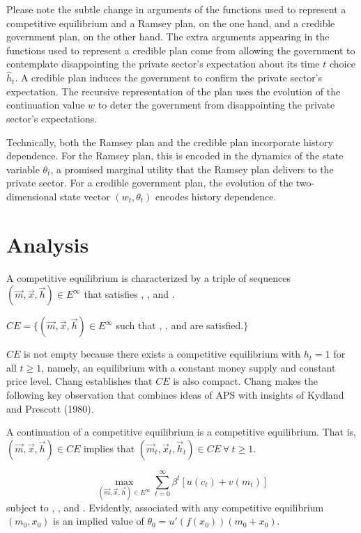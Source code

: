 Please note the subtle change in arguments of the functions used to represent  a competitive equilibrium and a  Ramsey plan, on the one hand,
and a credible government plan, on the other hand. The extra arguments appearing in the functions used to represent a credible plan
come from allowing the government to contemplate disappointing the private sector's expectation about its time $t$ choice $\hat h_t$. A credible plan induces
 the government to confirm the private sector's expectation.  The recursive representation of the plan uses
the evolution of the  continuation value $w$  to deter the government from disappointing the private sector's expectations.


Technically, both the Ramsey plan and the credible plan incorporate history dependence.  For the Ramsey plan, this is encoded in
the dynamics of the state variable $\theta_t$, a promised marginal utility that the Ramsey plan delivers to the private sector.
For a credible government plan, the evolution of the two-dimensional state vector $(w_t, \theta_t)$  encodes  history dependence.


\section{Analysis}

A competitive equilibrium  is characterized by a triple of sequences $(\vec m, \vec x, \vec h)  \in E^\infty$ that satisfies
, ,  and .

\medskip
{} $CE = \bigl\{ (\vec m, \vec x, \vec h) \in E^\infty $   such  that , ,   and  are satisfied.$\bigr\}$

\medskip
$CE$ is not empty because there exists a competitive equilibrium with $h_t =1 $ for all $t \geq 1$, namely,  an equilibrium with a constant money supply and
constant price level.  Chang establishes that $CE$ is also compact.
Chang makes the following key observation that combines ideas of  APS with insights of Kydland and Prescott (1980).

\medskip
{} A continuation of a competitive equilibrium is a competitive equilibrium. That is,
$(\vec m, \vec x, \vec h) \in CE$ implies that $(\vec m_t, \vec x_t, \vec h_t) \in CE \  \forall \ t \geq 1$.
\medskip

$$ \max_{(\vec m, \vec x, \vec h) \in E^\infty} \sum_{t=0}^\infty \beta^t \left[ u(c_t) + v(m_t) \right] $$
subject to ,   , and .
Evidently, associated with any competitive equilibrium $(m_0, x_0)$ is an implied value
of $\theta_0 = u'(f(x_0))(m_0 + x_0)$.
\medskip


